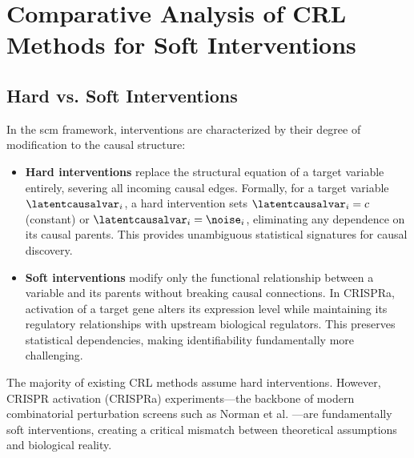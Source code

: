 
\section{Comparative Analysis of CRL Methods for Soft Interventions}
\label{app:crl_methods}

\subsection{Hard vs. Soft Interventions}
\label{app:crl_methods:intervention_types}

In the \gls{scm} framework, interventions are characterized by their degree of modification to the causal structure:

\begin{itemize}
    \item \textbf{Hard interventions} replace the structural equation of a target variable entirely, severing all incoming causal edges. Formally, for a target variable $\latentcausalvar_i$, a hard intervention sets $\latentcausalvar_i = c$ (constant) or $\latentcausalvar_i = \noise_i$, eliminating any dependence on its causal parents. This provides unambiguous statistical signatures for causal discovery.
    \item \textbf{Soft interventions} modify only the functional relationship between a variable and its parents without breaking causal connections. In CRISPRa, activation of a target gene alters its expression level while maintaining its regulatory relationships with upstream biological regulators. This preserves statistical dependencies, making identifiability fundamentally more challenging.
\end{itemize}

The majority of existing CRL methods assume hard interventions. However, CRISPR activation (CRISPRa) experiments---the backbone of modern combinatorial perturbation screens such as Norman et al. \citep{norman2019exploring}---are fundamentally soft interventions, creating a critical mismatch between theoretical assumptions and biological reality.

